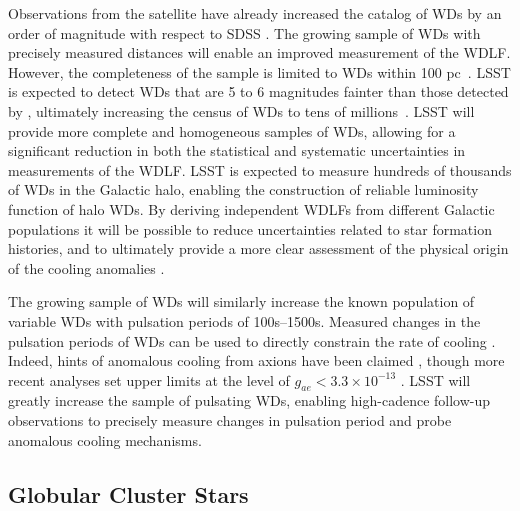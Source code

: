 Observations from the \Gaia satellite have already increased the catalog of WDs by an order of magnitude with respect to SDSS \citep{1805.01227,1807.03315,1807.02559}.
The growing sample of WDs with precisely measured distances will enable an improved measurement of the WDLF.  
However, the completeness of the \Gaia sample is limited to WDs within 100 pc~\citep{1807.03315}.
LSST is expected to detect WDs that are 5 to 6 magnitudes fainter than those detected by \Gaia, ultimately increasing the census of WDs to tens of millions~\citep{0912.0201}.
LSST will provide more complete and homogeneous samples of WDs, allowing for a significant reduction in both the statistical and systematic uncertainties in measurements of the WDLF. 
LSST is expected to measure hundreds of thousands of WDs in the Galactic halo, enabling the construction of reliable luminosity function of halo WDs. 
By deriving independent WDLFs from different Galactic populations it will be possible to reduce uncertainties related to star formation histories, and to ultimately provide a more clear assessment of the physical origin of the cooling anomalies \citep{Isern:2018uce}. 

The growing sample of WDs will similarly increase the known population of variable WDs with pulsation periods of 100s--1500s. 
Measured changes in the pulsation periods of WDs can be used to directly constrain the rate of cooling \citep[\eg][]{1007.2659}.
Indeed, hints of anomalous cooling from axions have been claimed \citep[\eg][]{Corsico:2012ki,Corsico:2012sh}, though more recent analyses set upper limits at the level of $g_{ae} < 3.3 \times 10^{-13}$ \citep{Battich:2016htm}. 
LSST will greatly increase the sample of pulsating WDs, enabling high-cadence follow-up observations to precisely measure changes in pulsation period and probe anomalous cooling mechanisms.


\subsection{Globular Cluster Stars}


